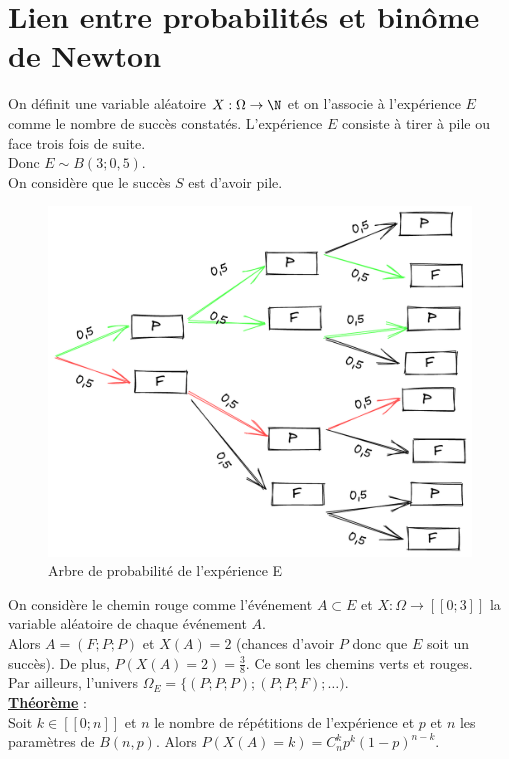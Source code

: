 \documentclass{report}
\begin{document}
\section{Lien entre probabilités et binôme de Newton}
On définit une variable aléatoire $X : \Omega \rightarrow \N$ et on l’associe à l’expérience $E$ comme le nombre de succès constatés. L’expérience $E$ consiste à tirer à pile ou face trois fois de suite. \\
Donc $E \sim B(3;0,5)$. \\
On considère que le succès $S$ est d’avoir pile. 
\begin{figure}[htp]
    \centering
    \includegraphics[width=\textwidth]{proba_newton.jpg}
    \caption{Arbre de probabilité de l'expérience E}
    \label{Arbre de probabilité de l'expérience E}
\end{figure} 
On considère le chemin rouge comme l’événement $A \subset E$ et $X : \Omega \rightarrow [\![0;3]\!]$ la variable aléatoire de chaque événement $A$. \\
Alors $A = (F;P;P)$ et $X(A) = 2$ (chances d’avoir $P$ donc que $E$ soit un succès).
De plus, $P(X(A)=2) = \frac{3}{8}$. Ce sont les chemins verts et rouges. \\
Par ailleurs, l’univers $\Omega_E = \{(P;P;P);(P;P;F);\dots)$. \\ 

\textbf{\underline{Théorème}} : \\

Soit $k \in [\![0;n]\!] $ et $n$ le nombre de répétitions de l’expérience et $p$ et $n$ les paramètres de $B(n,p)$. Alors $P(X(A)=k) = C^k_n p^k(1-p)^{n-k}$. 
\end{document}
